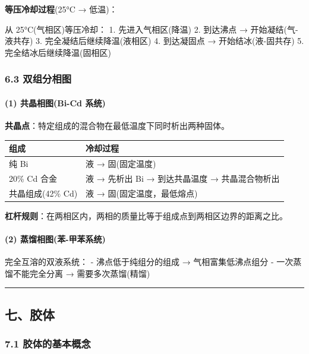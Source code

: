 \documentclass[a4paper,11pt]{ctexart}
\newcounter{none}
\begin{document}
\textbf{等压冷却过程}(25°C → 低温)：

从 25°C(气相区)等压冷却：
1. 先进入气相区(降温)
2. 到达沸点 → 开始凝结(气-液共存)
3. 完全凝结后继续降温(液相区)
4. 到达凝固点 → 开始结冰(液-固共存)
5. 完全结冰后继续降温(固相区)

\subsubsection{6.3 双组分相图}\label{ux53ccux7ec4ux5206ux76f8ux56fe}

\paragraph{(1) 共晶相图(Bi-Cd 系统)}\label{ux5171ux6676ux76f8ux56febi-cd-ux7cfbux7edf}

\textbf{共晶点}：特定组成的混合物在最低温度下同时析出两种固体。

{\def\LTcaptype{none} %
\begin{longtable}[]{@{}ll@{}}
\toprule\noalign{}
组成 & 冷却过程 \\
\midrule\noalign{}
\endhead
\bottomrule\noalign{}
\endlastfoot
纯 Bi & 液 → 固(固定温度) \\
20\% Cd 合金 & 液 → 先析出 Bi → 到达共晶温度 → 共晶混合物析出 \\
共晶组成(42\% Cd) & 液 → 固(固定温度，最低熔点) \\
\end{longtable}
}

\textbf{杠杆规则}：在两相区内，两相的质量比等于组成点到两相区边界的距离之比。

\paragraph{(2) 蒸馏相图(苯-甲苯系统)}\label{ux84b8ux998fux76f8ux56feux82ef-ux7532ux82efux7cfbux7edf}

完全互溶的双液系统：
- 沸点低于纯组分的组成 → 气相富集低沸点组分
- 一次蒸馏不能完全分离 → 需要多次蒸馏(精馏)

\begin{center}\rule{0.5\linewidth}{0.5pt}\end{center}

\subsection{七、胶体}\label{ux4e03ux80f6ux4f53}

\subsubsection{7.1 胶体的基本概念}\label{ux80f6ux4f53ux7684ux57faux672cux6982ux5ff5}
\end{document}
